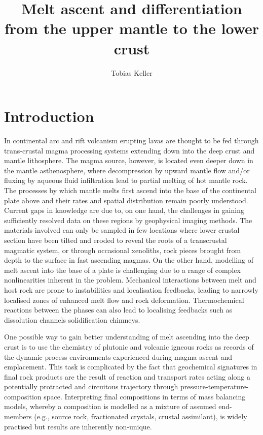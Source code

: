 \documentclass[12pt,a4paper]{article}
\title{Melt ascent and differentiation from the upper mantle to the lower crust}
\author{Tobias Keller}
\begin{document}
\maketitle \linenumbers \doublespace

\section{Introduction}
In continental arc and rift volcanism erupting lavas are thought to be fed through trans-crustal magma processing systems extending down into the deep crust and mantle lithosphere. The magma source, however, is located even deeper down in the mantle asthenosphere, where decompression by upward mantle flow and/or fluxing by aqueous fluid infiltration lead to partial melting of hot mantle rock. The processes by which mantle melts first ascend into the base of the continental plate above and their rates and spatial distribution remain poorly understood. Current gaps in knowledge are due to, on one hand, the challenges in gaining sufficiently resolved data on these regions by geophysical imaging methods. The materials involved can only be sampled in few locations where lower crustal section have been tilted and eroded to reveal the roots of a transcrustal magmatic system, or through occasional xenoliths, rock pieces brought from depth to the surface in fast ascending magmas. On the other hand, modelling of melt ascent into the base of a plate is challenging due to a range of complex nonlinearities inherent in the problem. Mechanical interactions between melt and host rock are prone to instabilities and localisation feedbacks, leading to narrowly localised zones of enhanced melt flow and rock deformation. Thermochemical reactions between the phases can also lead to localising feedbacks such as dissolution channels solidification chimneys.

One possible way to gain better understanding of melt ascending into the deep crust is to use the chemistry of plutonic and volcanic igneous rocks as records of the dynamic process environments experienced during magma ascent and emplacement. This task is complicated by the fact that geochemical signatures in final rock products are the result of reaction and transport rates acting along a potentially protracted and circuitous trajectory through pressure-temperature-composition space. Interpreting final compositions in terms of mass balancing models, whereby a composition is modelled as a mixture of assumed end-members (e.g., source rock, fractionated crystals, crustal assimilant), is widely practised but results are inherently non-unique. 
\end{document}
